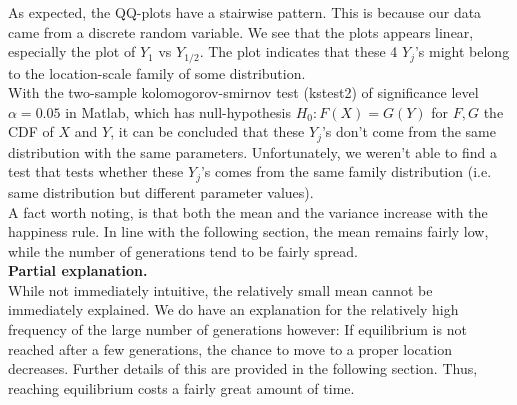 As expected, the QQ-plots have a stairwise pattern. 
This is because our data came from a discrete random variable. 
We see that the plots appears linear, especially the plot of $Y_{1}$ vs $Y_{1/2}$. 
The plot indicates that these 4 $Y_j$'s might belong to the location-scale family of some distribution.\\

With the two-sample kolomogorov-smirnov test (kstest2) of significance level $\alpha=0.05$ in Matlab, which has null-hypothesis $H_0:F(X)=G(Y)$ for $F,G$ the CDF of $X$ and $Y$, it can be concluded that these $Y_j$'s don't come from the same distribution with the same parameters. 
Unfortunately, we weren't able to find a test that tests whether these $Y_j$'s comes from the same family distribution (i.e. same distribution but different parameter values).\\

A fact worth noting, is that both the mean and the variance increase with the happiness rule. In line with the following section, the mean remains fairly low, while the number of generations tend to be fairly spread.\\

\textbf{Partial explanation.} \\
While not immediately intuitive, the relatively small mean cannot be immediately explained. We do have an explanation for the relatively high frequency of the large number of generations however: 
If equilibrium is not reached after a few generations, the chance to move to a proper location decreases. 
Further details of this are provided in the following section. 
Thus, reaching equilibrium costs a fairly great amount of time.

